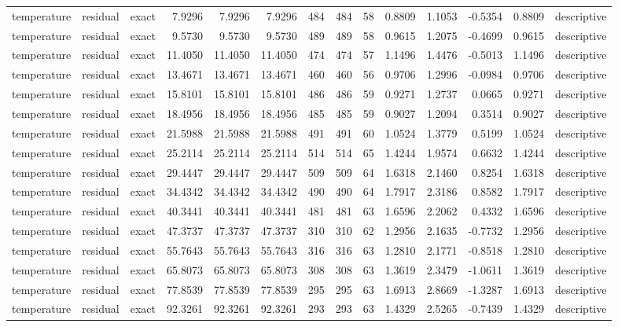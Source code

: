 \begin{tabular}{lllrrrrrrrrrrl}
temperature & residual & exact & 7.9296 & 7.9296 & 7.9296 & 484 & 484 & 58 & 0.8809 & 1.1053 & -0.5354 & 0.8809 & descriptive \\
temperature & residual & exact & 9.5730 & 9.5730 & 9.5730 & 489 & 489 & 58 & 0.9615 & 1.2075 & -0.4699 & 0.9615 & descriptive \\
temperature & residual & exact & 11.4050 & 11.4050 & 11.4050 & 474 & 474 & 57 & 1.1496 & 1.4476 & -0.5013 & 1.1496 & descriptive \\
temperature & residual & exact & 13.4671 & 13.4671 & 13.4671 & 460 & 460 & 56 & 0.9706 & 1.2996 & -0.0984 & 0.9706 & descriptive \\
temperature & residual & exact & 15.8101 & 15.8101 & 15.8101 & 486 & 486 & 59 & 0.9271 & 1.2737 & 0.0665 & 0.9271 & descriptive \\
temperature & residual & exact & 18.4956 & 18.4956 & 18.4956 & 485 & 485 & 59 & 0.9027 & 1.2094 & 0.3514 & 0.9027 & descriptive \\
temperature & residual & exact & 21.5988 & 21.5988 & 21.5988 & 491 & 491 & 60 & 1.0524 & 1.3779 & 0.5199 & 1.0524 & descriptive \\
temperature & residual & exact & 25.2114 & 25.2114 & 25.2114 & 514 & 514 & 65 & 1.4244 & 1.9574 & 0.6632 & 1.4244 & descriptive \\
temperature & residual & exact & 29.4447 & 29.4447 & 29.4447 & 509 & 509 & 64 & 1.6318 & 2.1460 & 0.8254 & 1.6318 & descriptive \\
temperature & residual & exact & 34.4342 & 34.4342 & 34.4342 & 490 & 490 & 64 & 1.7917 & 2.3186 & 0.8582 & 1.7917 & descriptive \\
temperature & residual & exact & 40.3441 & 40.3441 & 40.3441 & 481 & 481 & 63 & 1.6596 & 2.2062 & 0.4332 & 1.6596 & descriptive \\
temperature & residual & exact & 47.3737 & 47.3737 & 47.3737 & 310 & 310 & 62 & 1.2956 & 2.1635 & -0.7732 & 1.2956 & descriptive \\
temperature & residual & exact & 55.7643 & 55.7643 & 55.7643 & 316 & 316 & 63 & 1.2810 & 2.1771 & -0.8518 & 1.2810 & descriptive \\
temperature & residual & exact & 65.8073 & 65.8073 & 65.8073 & 308 & 308 & 63 & 1.3619 & 2.3479 & -1.0611 & 1.3619 & descriptive \\
temperature & residual & exact & 77.8539 & 77.8539 & 77.8539 & 295 & 295 & 63 & 1.6913 & 2.8669 & -1.3287 & 1.6913 & descriptive \\
temperature & residual & exact & 92.3261 & 92.3261 & 92.3261 & 293 & 293 & 63 & 1.4329 & 2.5265 & -0.7439 & 1.4329 & descriptive \\

\end{tabular}
